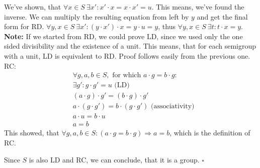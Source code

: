 \documentclass[a4paper]{article}
\begin{document}
We've shown, that $\forall x \in S\ \exists x': x'\cdot x = x \cdot x' = u$. This means, we've found the inverse. We can multiply the resulting equation from left by $y$ and get the final form for RD. $\forall y, x \in S\ \exists x': (y\cdot x')\cdot x = y\cdot u = y$, thus $\forall y, x \in S\ \exists t: t\cdot x = y$. \\

\textbf{Note:} If we started from RD, we could prove LD, since we used only the one sided divisibility and the existence of a unit. This means, that for each semigroup with a unit, LD is equivalent to RD. Proof follows easily from the previous one.\\

RC:
\begin{align*}
 & \forall g, a, b \in S, \text{ for which } a\cdot g = b\cdot g: \\
 & \exists g': g\cdot g' = u \text{ (LD)} \\
 & (a\cdot g)\cdot g' = (b\cdot g)\cdot g' \\
 & a\cdot(g\cdot g') = b\cdot (g\cdot g') \text { (associativity)} \\
 & a\cdot u = b \cdot u \\
 & a = b 
\end{align*}
This showed, that $\forall g, a, b \in S: (a\cdot g = b\cdot g) \Rightarrow a = b$, which is the definition of RC.

Since $S$ is also LD and RC, we can conclude, that it is a group. $\square$ \\
    
\end{document}
